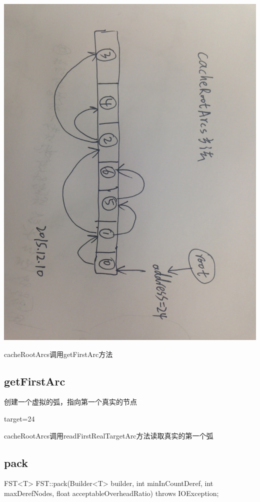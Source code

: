 \documentclass{article}
\begin{document}
\begin{center}
    \includegraphics[width=480pt]{IMG_2811.JPG}
\end{center}

cacheRootArcs调用getFirstArc方法

\subsection{getFirstArc}

创建一个虚拟的弧，指向第一个真实的节点

target=24

cacheRootArcs调用readFirstRealTargetArc方法读取真实的第一个弧

\subsection{pack}

FST<T> FST::pack(Builder<T> builder, int minInCountDeref, int maxDerefNodes, float acceptableOverheadRatio) throws IOException;
\end{document}
